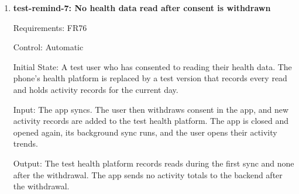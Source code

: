\documentclass[12pt, titlepage]{article}
\begin{document}
\begin{enumerate}
Requirements: FR75

Control: Automatic

Initial State: A test user with the default reminder period and every reminder
type turned on, in a fixed time zone, with two friends, F and G.

Input: On day $d$, an administrator publishes a new concept explanation at
10:00, publishes a new knowledge check at 11:00, and edits an existing concept
explanation at 12:00. At 13:00, F shares an update with the user. At 14:00, G
shares an update with F only.

Output: The user receives two Learning reminders, for the new explanation and
the new knowledge check, and one Social reminder, for F's update. All are
delivered between 9:00 and 20:00.

Test Case Derivation: A Learning reminder is sent when a new concept
explanation or knowledge check is published (SRS Section 6.6), so one of each
is published. An edit does not publish new content, so it gives no reminder,
which catches a system that reminds every user each time content is
corrected. A Social reminder is sent when a friend shares an update with the
user or sends a friend request. Friend requests are tested in test-remind-2,
so this test uses a shared update. G chooses to share only with F (FR66), so a
reminder for G's update would tell the user about an update they cannot see.

How test will be performed: As in test-remind-5.

\item{\textbf{test-remind-7: No health data read after consent is
withdrawn}\\}

Requirements: FR76

Control: Automatic

Initial State: A test user who has consented to \progname{} reading their
health data. The phone's health platform is replaced by a test version that
records every read and holds activity records for the current day.

Input: The app syncs. The user then withdraws consent in the app, and new
activity records are added to the test health platform. The app is closed and
opened again, its background sync runs, and the user opens their activity
trends.

Output: The test health platform records reads during the first sync and none
after the withdrawal. The app sends no activity totals to the backend after
the withdrawal.


\end{enumerate}
\end{document}
